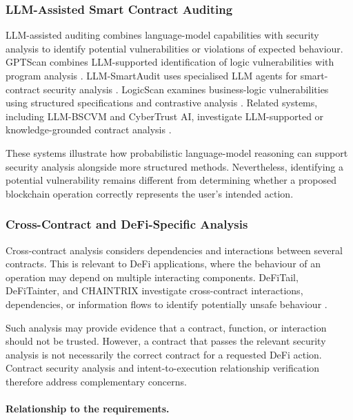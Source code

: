 \subsubsection{LLM-Assisted Smart Contract Auditing}

LLM-assisted auditing combines language-model capabilities
with security analysis to identify potential vulnerabilities
or violations of expected behaviour. GPTScan combines LLM-supported identification of logic
vulnerabilities with program analysis
\cite{sunGPTScanDetectingLogic2023}.
LLM-SmartAudit uses specialised LLM agents for
smart-contract security analysis
\cite{weiLLMSmartAuditAdvanced2024}.
LogicScan examines business-logic vulnerabilities using
structured specifications and contrastive analysis
\cite{gaoLogicScanLLMDriven2026}.
Related systems, including LLM-BSCVM and CyberTrust AI,
investigate LLM-supported or knowledge-grounded contract
analysis
\cite{TODO_LLM_BSCVM,TODO_CyberTrustAI}.

These systems illustrate how probabilistic language-model
reasoning can support security analysis alongside more
structured methods. Nevertheless, identifying a potential
vulnerability remains different from determining whether
a proposed blockchain operation correctly represents the
user's intended action.

\subsubsection{Cross-Contract and DeFi-Specific Analysis}

Cross-contract analysis considers dependencies and
interactions between several contracts. This is relevant
to DeFi applications, where the behaviour of an operation
may depend on multiple interacting components. DeFiTail, DeFiTainter, and CHAINTRIX investigate
cross-contract interactions, dependencies, or information
flows to identify potentially unsafe behaviour
\cite{TODO_DeFiTail,TODO_DeFiTainter,
TODO_CHAINTRIX}.

Such analysis may provide evidence that a contract,
function, or interaction should not be trusted. However,
a contract that passes the relevant security analysis
is not necessarily the correct contract for a requested
DeFi action. Contract security analysis and
intent-to-execution relationship verification therefore
address complementary concerns.

\paragraph{Relationship to the requirements.}

